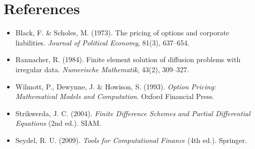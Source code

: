 \documentclass[12pt, a4paper]{article}
\begin{document}
\section*{References}

\begin{itemize}[noitemsep]
    \item Black, F. \& Scholes, M. (1973). The pricing of options and
          corporate liabilities. \textit{Journal of Political Economy}, 81(3),
          637--654.
    \item Rannacher, R. (1984). Finite element solution of diffusion problems
          with irregular data. \textit{Numerische Mathematik}, 43(2), 309--327.
    \item Wilmott, P., Dewynne, J. \& Howison, S. (1993). \textit{Option
          Pricing: Mathematical Models and Computation}. Oxford Financial
          Press.
    \item Strikwerda, J. C. (2004). \textit{Finite Difference Schemes and
          Partial Differential Equations} (2nd ed.). SIAM.
    \item Seydel, R. U. (2009). \textit{Tools for Computational Finance}
          (4th ed.). Springer.
\end{itemize}
\end{document}
